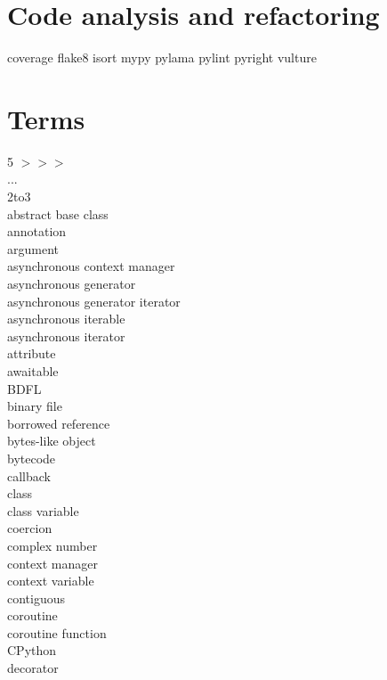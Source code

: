 \documentclass [8pt] {extarticle}
\begin{document}
    \section {Code analysis and refactoring}

    coverage \quad
    flake8 \quad
    isort \quad
    mypy \quad
    pylama \quad
    pylint \quad
    pyright \quad
    vulture \quad

    \section {Terms}

    \begin {multicols} {5}
        $ >>> $ \\
        ... \\
        2to3 \\
        abstract base class \\
        annotation \\
        argument \\
        asynchronous context manager \\
        asynchronous generator \\
        asynchronous generator iterator \\
        asynchronous iterable \\
        asynchronous iterator \\
        attribute \\
        awaitable \\
        BDFL \\
        binary file \\
        borrowed reference \\
        bytes-like object \\
        bytecode \\
        callback \\
        class \\
        class variable \\
        coercion \\
        complex number \\
        context manager \\
        context variable \\
        contiguous \\
        coroutine \\
        coroutine function \\
        CPython \\
        decorator \\

\end{multicols}
\end{document}
